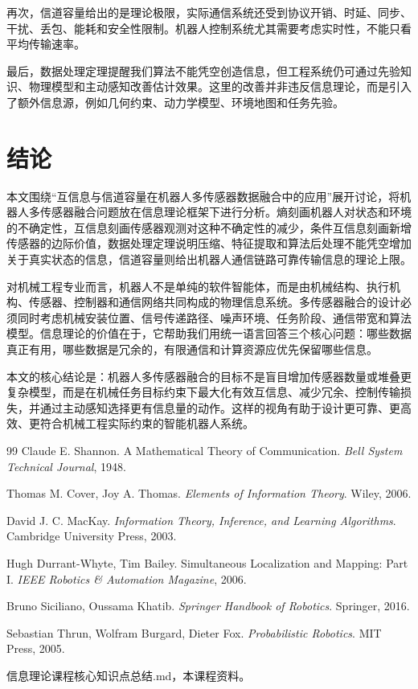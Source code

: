 \documentclass[UTF8,a4paper,12pt]{ctexart}
\begin{document}
再次，信道容量给出的是理论极限，实际通信系统还受到协议开销、时延、同步、干扰、丢包、能耗和安全性限制。机器人控制系统尤其需要考虑实时性，不能只看平均传输速率。

最后，数据处理定理提醒我们算法不能凭空创造信息，但工程系统仍可通过先验知识、物理模型和主动感知改善估计效果。这里的改善并非违反信息理论，而是引入了额外信息源，例如几何约束、动力学模型、环境地图和任务先验。

\section{结论}

本文围绕“互信息与信道容量在机器人多传感器数据融合中的应用”展开讨论，将机器人多传感器融合问题放在信息理论框架下进行分析。熵刻画机器人对状态和环境的不确定性，互信息刻画传感器观测对这种不确定性的减少，条件互信息刻画新增传感器的边际价值，数据处理定理说明压缩、特征提取和算法后处理不能凭空增加关于真实状态的信息，信道容量则给出机器人通信链路可靠传输信息的理论上限。

对机械工程专业而言，机器人不是单纯的软件智能体，而是由机械结构、执行机构、传感器、控制器和通信网络共同构成的物理信息系统。多传感器融合的设计必须同时考虑机械安装位置、信号传递路径、噪声环境、任务阶段、通信带宽和算法模型。信息理论的价值在于，它帮助我们用统一语言回答三个核心问题：哪些数据真正有用，哪些数据是冗余的，有限通信和计算资源应优先保留哪些信息。

本文的核心结论是：机器人多传感器融合的目标不是盲目增加传感器数量或堆叠更复杂模型，而是在机械任务目标约束下最大化有效互信息、减少冗余、控制传输损失，并通过主动感知选择更有信息量的动作。这样的视角有助于设计更可靠、更高效、更符合机械工程实际约束的智能机器人系统。

\begin{thebibliography}{99}
Claude E. Shannon. A Mathematical Theory of Communication. \textit{Bell System Technical Journal}, 1948.

Thomas M. Cover, Joy A. Thomas. \textit{Elements of Information Theory}. Wiley, 2006.

David J. C. MacKay. \textit{Information Theory, Inference, and Learning Algorithms}. Cambridge University Press, 2003.

Hugh Durrant-Whyte, Tim Bailey. Simultaneous Localization and Mapping: Part I. \textit{IEEE Robotics \& Automation Magazine}, 2006.

Bruno Siciliano, Oussama Khatib. \textit{Springer Handbook of Robotics}. Springer, 2016.

Sebastian Thrun, Wolfram Burgard, Dieter Fox. \textit{Probabilistic Robotics}. MIT Press, 2005.

信息理论课程核心知识点总结.md，本课程资料。
\end{thebibliography}
\end{document}
